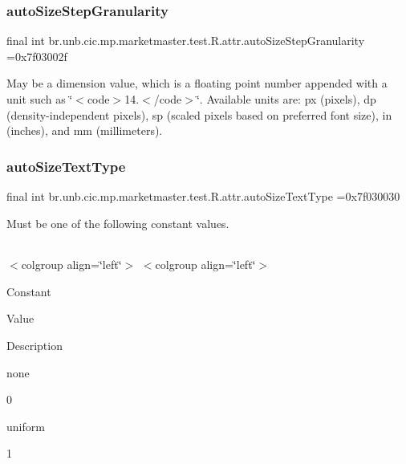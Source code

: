 \subsubsection{\texorpdfstring{auto\+Size\+Step\+Granularity}{autoSizeStepGranularity}}
{\footnotesize\ttfamily final int br.\+unb.\+cic.\+mp.\+marketmaster.\+test.\+R.\+attr.\+auto\+Size\+Step\+Granularity =0x7f03002f\hspace{0.3cm}{\ttfamily [static]}}

May be a dimension value, which is a floating point number appended with a unit such as \char`\"{}$<$code$>$14.\+5sp$<$/code$>$\char`\"{}. Available units are\+: px (pixels), dp (density-\/independent pixels), sp (scaled pixels based on preferred font size), in (inches), and mm (millimeters). \mbox{\label{classbr_1_1unb_1_1cic_1_1mp_1_1marketmaster_1_1test_1_1R_1_1attr_ac689413d8cd0c274f9d777d987d85251}} 
\subsubsection{\texorpdfstring{auto\+Size\+Text\+Type}{autoSizeTextType}}
{\footnotesize\ttfamily final int br.\+unb.\+cic.\+mp.\+marketmaster.\+test.\+R.\+attr.\+auto\+Size\+Text\+Type =0x7f030030\hspace{0.3cm}{\ttfamily [static]}}

Must be one of the following constant values.

\tabulinesep=1mm
\begin{longtabu} spread 0pt [c]{*{0}{|X[-1]}|}
\hline
\end{longtabu}
$<$colgroup align=\char`\"{}left\char`\"{}$>$ $<$colgroup align=\char`\"{}left\char`\"{}$>$ 

Constant

Value

Description 

none

0

uniform

1\mbox{\label{classbr_1_1unb_1_1cic_1_1mp_1_1marketmaster_1_1test_1_1R_1_1attr_a4bbc4b77f4146ddd656b0ea47827dc6c}} 

